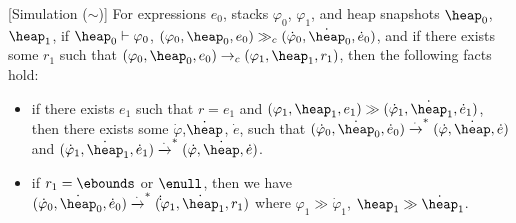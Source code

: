 \begin{thm}\label{simulation-thm}[Simulation ($\sim$)]
For \lang expressions $e_0$, stacks $\varphi_0$, $\varphi_1$, and heap snapshots $\heap_0$, $\heap_1$, 
if $\heap_0 \vdash \varphi_0$, $(\varphi_0,\heap_0,e_0)\gg_c (\dot \varphi_0,\dot \heap_0, \dot e_0)$,
and if there exists some $r_1$ such that $(\varphi_0, \heap_0, e_0)
\rightarrow_c (\varphi_1, \heap_1, r_1)$, then the following facts hold:

\begin{itemize}

\item if there exists $e_1$ such that $r=e_1$ and $(\varphi_1, \heap_1, e_1) \gg (\dot \varphi_1, \dot \heap_1, \dot e_1)$, then there exists some $\dot \varphi$,$\dot \heap$, $\dot e$, such that
$(\dot \varphi_0, \dot \heap_0,\dot e_0) \xrightarrow{\cdot}^* (\dot
\varphi,\dot \heap,\dot e)$ and $(\dot
\varphi_1,\dot \heap_1,\dot e_1) \xrightarrow{\cdot}^* (\dot \varphi,
\dot \heap,\dot e)$.

\item if $r_1 = \ebounds$ or $\enull$, then we have $(\dot \varphi_0, \dot \heap_0,\dot e_0) \xrightarrow{\cdot}^* (\dot
\dot \varphi_1,\dot \heap_1, r_1)$ where $\varphi_1 \gg \dot
\varphi_1$, $\heap_1 \gg \dot \heap_1$.

\end{itemize}
\end{thm}



